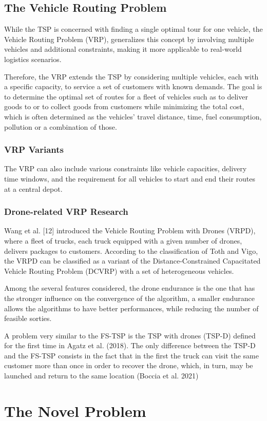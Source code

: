 \documentclass{article}
\begin{document}
	
	
	\subsection{The Vehicle Routing Problem}
	While the TSP is concerned with finding a single optimal tour for one vehicle, the Vehicle Routing Problem (VRP), generalizes this concept by involving multiple vehicles and additional constraints, making it more applicable to real-world logistics scenarios.
	\par
	Therefore, the VRP extends the TSP by considering multiple vehicles, each with a specific capacity, to service a set of customers with known demands. The goal is to determine the optimal set of routes for a fleet of vehicles such as to deliver goods to or to collect goods from customers while minimizing the total cost, which is often determined as the vehicles' travel distance, time, fuel consumption, pollution or a combination of those. 
	\subsubsection{VRP Variants}
	The VRP can also include various constraints like vehicle capacities, delivery time windows, and the requirement for all vehicles to start and end their routes at a central depot.
	\subsubsection{Drone-related VRP Research}
	Wang et al. [12] introduced the Vehicle Routing Problem with Drones (VRPD), where a ﬂeet of trucks, each truck equipped with a given number of drones, delivers packages to customers. According to the classiﬁcation of Toth and Vigo, the VRPD can be classiﬁed as a variant of the Distance-Constrained Capacitated Vehicle Routing Problem (DCVRP) with a set of heterogeneous vehicles.
	\par 
	Among the several features considered, the drone endurance is the one that
	has the stronger influence on the convergence of the algorithm, a smaller endurance
	allows the algorithms to have better performances, while reducing the number of
	feasible sorties.
	\par 
	A problem very similar to the FS-TSP is the TSP with drones (TSP-D) defined for the first time in Agatz et al. (2018). The only
	difference between the TSP-D and the FS-TSP consists in the fact that in the first the truck can visit the same customer more than once in
	order to recover the drone, which, in turn, may be launched and return to the same location (Boccia et al. 2021)
	\section{The Novel Problem}
	
\end{document}
